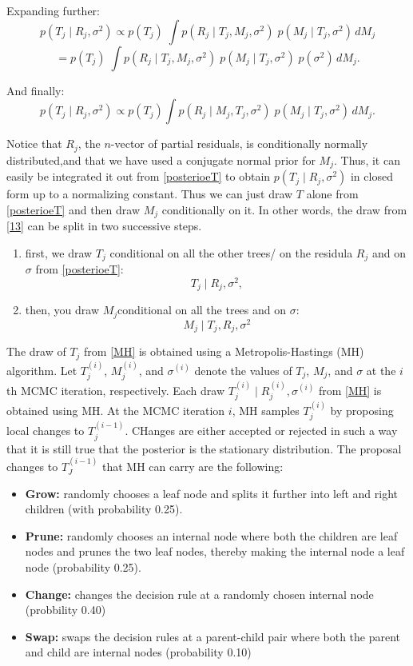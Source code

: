 \documentclass[a4paper,11pt]{article}
\begin{document}
Expanding further:
\[
p(T_j \mid R_j, \sigma^2) \propto p(T_j) \; \int p(R_j \mid T_j, M_j, \sigma^2) \; p(M_j \mid T_j, \sigma^2) \, dM_j
\]
\[
= p(T_j) \; \int p(R_j \mid T_j, M_j, \sigma^2) \; p(M_j \mid T_j, \sigma^2) \; p(\sigma^2) \, dM_j.
\]

And finally:
\begin{equation}
p(T_j \mid R_j, \sigma^2) \propto p(T_j) \int p(R_j \mid M_j, T_j, \sigma^2) \; p(M_j \mid T_j, \sigma^2) \, dM_j. \label{posterioeT}
\end{equation}

Notice that $R_j$, the $n$-vector of partial residuals, is conditionally normally distributed,and that we have used a conjugate normal prior for $M_j$. Thus, it can easily be integrated it out from \eqref{posterioeT} to obtain $p(T_j \mid R_j, \sigma^2)$ in closed form up to a normalizing constant. Thus we can just draw $T$ alone from \eqref{posterioeT} and then draw $M_j$ conditionally on it.  In other words, the draw from \eqref{13} can be split in two successive steps.
\begin{enumerate}
    \item  first,  we draw  $T_j$ conditional on all the other trees/ on the residula $R_j$ and on $\sigma$ from \eqref{posterioeT}:
\begin{equation}
 T_j \mid R_j, \sigma^2, \label{MH}
\end{equation}
\item then, you draw $M_j$conditional on all the trees and on $\sigma$:
\begin{equation}
M_j \mid T_j, R_j, \sigma^2 \label{drawM}
\end{equation}
\end{enumerate}
The draw of $T_j$ from \eqref{MH} is obtained using a Metropolis-Hastings (MH) algorithm. Let \( T_j^{(i)} \), \( M_j^{(i)} \), and \( \sigma^{(i)} \) denote the values of \( T_j \), \( M_j \), and \( \sigma \) at the \( i \)th MCMC iteration, respectively. Each draw  \( T_j^{(i)} \mid R_j^{(i)}, \sigma^{(i)} \) from \eqref{MH} is obtained using MH. At the MCMC iteration $i$, MH samples $T_j^{(i)}$ by proposing local changes to $T_j^{(i-1)}$. CHanges are either accepted or rejected in such a way that it is still true that the posterior is the stationary distribution. 
The proposal changes to $T_J^{(i-1)}$ that MH can carry are the following: 
\begin{itemize}
    \item \textbf{Grow:} randomly chooses a leaf node and splits it further into left and right children (with probability 0.25). 
    \item \textbf{Prune:} randomly chooses an internal node where both the children are leaf nodes and prunes the two leaf nodes, thereby making the internal node a leaf node (probability 0.25). 
    \item \textbf{Change:} changes the decision rule at a randomly chosen internal node (probbility 0.40)
    \item \textbf{Swap:} swaps the decision rules at a parent-child pair where both the parent and child are internal nodes (probability 0.10)
    \end{itemize}
\end{document}
